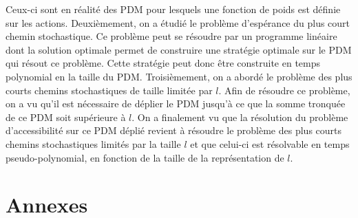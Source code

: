 \documentclass[12pt,a4paper]{report}
\theoremstyle{definition}%
\theoremstyle{remark}
\begin{document}
Ceux-ci sont en réalité des PDM pour lesquels une fonction
de poids est définie sur les actions. Deuxièmement, on a étudié le problème
d'espérance du plus court chemin stochastique. Ce problème peut se résoudre par
un programme linéaire dont la solution optimale permet de construire une stratégie
optimale sur le PDM qui résout ce problème. Cette stratégie peut donc être
construite en temps polynomial en la taille du PDM. Troisièmement, on a abordé le
problème des plus courts chemins stochastiques de taille limitée par $l$.
Afin de résoudre ce problème, on a vu qu'il est nécessaire de déplier le PDM
jusqu'à ce que la somme tronquée de ce PDM soit supérieure à $l$. On a finalement vu que
la résolution du problème d'accessibilité sur ce PDM déplié revient à résoudre le
problème des plus courts chemins stochastiques limités par la taille $l$ et que
celui-ci est résolvable en temps pseudo-polynomial, en fonction de la taille
de la représentation de $l$.




\chapter*{Annexes}
\end{document}

